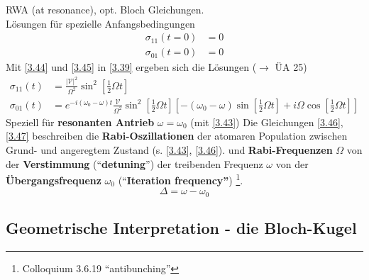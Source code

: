
\noindent
RWA (at resonance), opt. Bloch Gleichungen.\\[5pt]
Lösungen für spezielle Anfangsbedingungen
\begin{equation}
\begin{aligned}
\sigma_{11}(t = 0) &= 0 \\
\sigma_{01}(t = 0) &= 0
\end{aligned}
\label{3.45}
\end{equation}
Mit \eqref{3.44} und \eqref{3.45} in \eqref{3.39} ergeben sich die Lösungen ($ \to $ ÜA 25)
\begin{equation}
\begin{aligned}
\sigma_{11}(t) &= \frac{|\mathcal{V}|^2}{\Omega^2} \sin^2 \left[\frac{1}{2} \Omega t\right] \\
\sigma_{01}(t) &= e^{-i(\omega_0 - \omega )t} \frac{\mathcal{V}}{\Omega^2} \sin^2 \left[\frac{1}{2} \Omega t\right] \left[- (\omega_0 - \omega) \sin\left[\frac{1}{2} \Omega t\right] + i \Omega \cos \left[\frac{1}{2} \Omega t\right]\right]
\end{aligned}
\label{3.46}
\end{equation}
Speziell für \textbf{resonanten Antrieb} $ \omega = \omega_0 $ (mit \eqref{3.43})
Die Gleichungen \eqref{3.46}, \eqref{3.47} beschreiben die \textbf{Rabi-Oszillationen} der atomaren Population zwischen Grund- und angeregtem Zustand (s. \cref{3.43}, \eqref{3.46}). und \textbf{Rabi-Frequenzen} $ \Omega $ von der \textbf{Verstimmung} (``\textbf{detuning}'') der treibenden Frequenz $ \omega $ von der \textbf{Übergangsfrequenz} $ \omega_0 $ (``\textbf{Iteration frequency''}) \footnote{Colloquium 3.6.19 ``antibunching''}.
\begin{equation}
\Delta = \omega - \omega_0
\label{3.48}
\end{equation}

\subsection{Geometrische Interpretation - die Bloch-Kugel}


